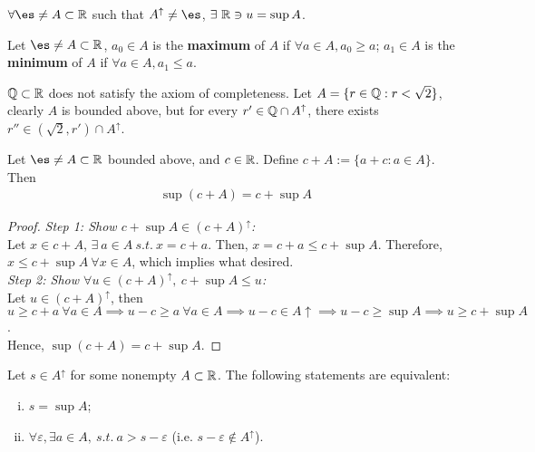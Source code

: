 \documentclass[11pt]{article}
\begin{document}
	\begin{axiom}
		$\forall \es \neq A \subset \R$ such that $A^\uparrow \neq \es$, $\exists\ \mathbb{R} \ni u = \sup A$.
	\end{axiom}
	
	\begin{definition}
		Let $\es \neq A \subset \R$, $a_0 \in A$ is the \textbf{maximum} of $A$ if $\forall a \in A, a_0 \geq a $; $a_1 \in A$ is the \textbf{minimum} of $A$ if 
		$\forall a \in A, a_1 \leq a$.
	\end{definition}
	
	\begin{example}
		$\mathbb{Q} \subset \mathbb{R}$ does not satisfy the axiom of completeness. Let $A = \{r \in \mathbb{Q}: r < \sqrt{2}\}$, clearly $A$ is bounded above, but for every $r' \in \mathbb{Q} \cap A^\uparrow$, there exists $r'' \in (\sqrt{2}, r') \cap A^\uparrow$.
	\end{example}
	
	\begin{proposition}
		Let $\es \neq A \subset \R$ bounded above, and $c \in \mathbb{R}$. Define $c + A := \{a + c: a \in A\}$. Then
		\begin{align}
			\sup (c + A) = c + \sup A
		\end{align}
	\end{proposition}
	
	\begin{proof}
		\emph{Step 1: Show $c + \sup A \in (c + A)^\uparrow$:} \\
		Let $x \in c + A$, $\exists\ a \in A\ s.t.\ x = c + a$. Then, $x = c + a \leq c + \sup A$. Therefore, $x \leq c + \sup A\ \forall x \in A$, which implies what desired. \\
		\emph{Step 2: Show $\forall u \in (c + A)^\uparrow,\ c + \sup A \leq u$: }\\
		Let $u \in (c + A)^\uparrow$, then $u \geq c + a\ \forall a \in A \implies u - c \geq a\ \forall a \in A \implies u - c \in A\uparrow \implies u - c \geq \sup A \implies u \geq c + \sup A$. \\
		Hence, $\sup (c + A) = c + \sup A$.
	\end{proof}
	
	\begin{lemma}
		Let $s \in A^\uparrow$ for some nonempty $A \subset \mathbb{R}$. The following statements are equivalent:
		\begin{enumerate}[(i)]
			\item $s = \sup A$;
			\item $\forall \varepsilon, \exists a \in A,\ s.t.\ a > s - \varepsilon$ (i.e. $s - \varepsilon \notin A^\uparrow$).
		\end{enumerate}
	\end{lemma}
	
\end{document}
